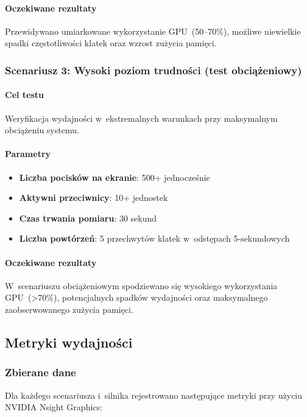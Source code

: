\paragraph{Oczekiwane rezultaty}
Przewidywano umiarkowane wykorzystanie GPU~(50--70\%), możliwe niewielkie spadki częstotliwości klatek oraz wzrost zużycia pamięci.

\subsubsection{Scenariusz 3: Wysoki poziom trudności (test obciążeniowy)}

\paragraph{Cel testu}
Weryfikacja wydajności w~ekstremalnych warunkach przy maksymalnym obciążeniu systemu.

\paragraph{Parametry}
\begin{itemize}
    \item \textbf{Liczba pocisków na ekranie}: 500+ jednocześnie
    \item \textbf{Aktywni przeciwnicy}: 10+ jednostek
    \item \textbf{Czas trwania pomiaru}: 30 sekund
    \item \textbf{Liczba powtórzeń}: 5 przechwytów klatek w~odstępach 5-sekundowych
\end{itemize}

\paragraph{Oczekiwane rezultaty}
W~scenariuszu obciążeniowym spodziewano się wysokiego wykorzystania GPU~(>70\%), potencjalnych spadków wydajności oraz maksymalnego zaobserwowanego zużycia pamięci.

\subsection{Metryki wydajności}

\subsubsection{Zbierane dane}

Dla każdego scenariusza i~silnika rejestrowano następujące metryki przy użyciu NVIDIA Nsight Graphics:


